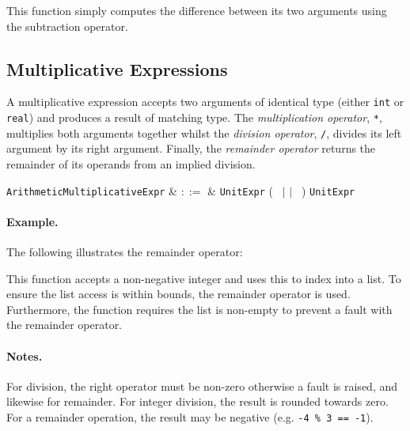 

This function simply computes the difference between its two arguments using the subtraction operator.


\subsection{Multiplicative Expressions}
\label{c_expr_multiplicative}

A multiplicative expression accepts two arguments of identical type (either \lstinline{int} or \lstinline{real}) and produces a result of matching type.  The {\em multiplication operator}, \lstinline{*}, multiplies both arguments together whilst the {\em division operator}, \lstinline{/}, divides its left argument by its right argument.  Finally, the {\em remainder operator} returns the remainder of its operands from an implied division.  

\begin{syntax}
  \verb+ArithmeticMultiplicativeExpr+ & $::=$ & \verb+UnitExpr+ \big(\ \token{*} $|$ \token{/} $|$ \token{\%}\ \big) \verb+UnitExpr+\\
\end{syntax}

\paragraph{Example.} The following illustrates the remainder operator:



This function accepts a non-negative integer and uses this to index into a list.  To ensure the list access is within bounds, the remainder operator is used.  Furthermore, the function requires the list is non-empty to prevent a fault with the remainder operator.

\paragraph{Notes.}  For division, the right operator must be non-zero otherwise a \gls{fault} is raised, and likewise for remainder.  For integer division, the result is rounded towards zero.  For a remainder operation, the result may be negative (e.g. \lstinline{-4 % 3 == -1}).


